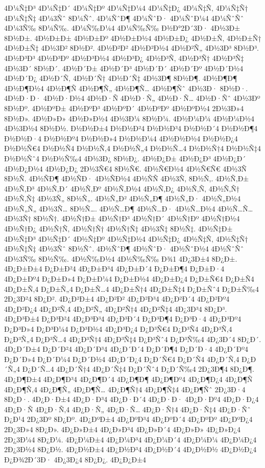 {4Ð¼Ñ‡Ð³
4Ð¼Ñ‡Ð´
4Ð¼Ñ‡Ðº
4Ð¼Ñ‡Ð¼4
4Ð¼Ñ‡Ð¿
4Ð¼Ñ‡Ñ‚
4Ð¼Ñ‡Ñ†
4Ð¼Ñ‡Ñ‡
4Ð¼3Ñˆ
8Ð¼Ñˆ.
4Ð¼ÑˆÐ¶
4Ð¼ÑˆÐ·
4Ð¼ÑˆÐ¼4
4Ð¼ÑˆÑˆ
4Ð¼3Ñ‰
8Ð¼Ñ‰.
4Ð¼Ñ‰Ð¼4
4Ð¼Ñ‰Ñ‰
Ð½Ð°2Ð´3Ð·
4Ð½3Ð±
8Ð½Ð±.
4Ð½Ð±Ð±
4Ð½Ð±Ðº
4Ð½Ð±Ð½4
4Ð½Ð±Ð¿
4Ð½Ð±Ñ‚
4Ð½Ð±Ñ†
4Ð½Ð±Ñ‡
4Ð½3Ð²
8Ð½Ð².
4Ð½Ð²Ð²
4Ð½Ð²Ð½4
4Ð½Ð²Ñ„
4Ð½3Ð³
8Ð½Ð³.
4Ð½Ð³Ð³
4Ð½Ð³Ðº
4Ð½Ð³Ð½4
4Ð½Ð³Ð¿
4Ð½Ð³Ñ‚
4Ð½Ð³Ñ†
4Ð½Ð³Ñ‡
4Ð½3Ð´
8Ð½Ð´.
4Ð½Ð´Ð±
4Ð½Ð´Ð³
4Ð½Ð´Ð´
4Ð½Ð´Ðº
4Ð½Ð´Ð½4
4Ð½Ð´Ð¿
4Ð½Ð´Ñ‚
4Ð½Ð´Ñ†
4Ð½Ð´Ñ‡
4Ð½3Ð¶
8Ð½Ð¶.
4Ð½Ð¶Ð¶
4Ð½Ð¶Ð½4
4Ð½Ð¶Ñ
4Ð½Ð¶Ñ„
4Ð½Ð¶Ñ…
4Ð½Ð¶Ñˆ
4Ð½3Ð·
8Ð½Ð·.
4Ð½Ð·Ð·
4Ð½Ð·Ð½4
4Ð½Ð·Ñ
4Ð½Ð·Ñ„
4Ð½Ð·Ñ…
4Ð½Ð·Ñˆ
4Ð½3Ðº
8Ð½Ðº.
4Ð½ÐºÐ±
4Ð½ÐºÐ³
4Ð½ÐºÐ´
4Ð½ÐºÐº
4Ð½ÐºÐ½4
2Ð½3Ð»4
8Ð½Ð».
4Ð½Ð»Ð»
4Ð½Ð»Ð½4
4Ð½3Ð¼
8Ð½Ð¼.
4Ð½Ð¼Ð¼
4Ð½Ð¼Ð½4
4Ð½3Ð½4
8Ð½Ð½.
Ð½Ð½Ð±4
Ð½Ð½Ð²4
Ð½Ð½Ð³4
Ð½Ð½Ð´4
Ð½Ð½Ð¶4
Ð½Ð½Ð·4
Ð½Ð½Ðº4
Ð½Ð½Ð»4
Ð½Ð½Ð¼4
4Ð½Ð½Ð½4
Ð½Ð½Ð¿4
Ð½Ð½Ñ€4
Ð½Ð½Ñ4
Ð½Ð½Ñ‚4
Ð½Ð½Ñ„4
Ð½Ð½Ñ…4
Ð½Ð½Ñ†4
Ð½Ð½Ñ‡4
Ð½Ð½Ñˆ4
Ð½Ð½Ñ‰4
4Ð½3Ð¿
8Ð½Ð¿.
4Ð½Ð¿Ð±
4Ð½Ð¿Ð³
4Ð½Ð¿Ð´
4Ð½Ð¿Ð½4
4Ð½Ð¿Ð¿
2Ð½3Ñ€4
8Ð½Ñ€.
4Ð½Ñ€Ð½4
4Ð½Ñ€Ñ€
4Ð½3Ñ
8Ð½Ñ.
4Ð½ÑÐ¶
4Ð½ÑÐ·
4Ð½ÑÐ½4
4Ð½ÑÑ
4Ð½3Ñ‚
8Ð½Ñ‚.
4Ð½Ñ‚Ð±
4Ð½Ñ‚Ð³
4Ð½Ñ‚Ð´
4Ð½Ñ‚Ðº
4Ð½Ñ‚Ð½4
4Ð½Ñ‚Ð¿
4Ð½Ñ‚Ñ‚
4Ð½Ñ‚Ñ†
4Ð½Ñ‚Ñ‡
4Ð½3Ñ„
8Ð½Ñ„.
4Ð½Ñ„Ð²
4Ð½Ñ„Ð¶
4Ð½Ñ„Ð·
4Ð½Ñ„Ð½4
4Ð½Ñ„Ñ„
4Ð½3Ñ…
8Ð½Ñ….
4Ð½Ñ…Ð¶
4Ð½Ñ…Ð·
4Ð½Ñ…Ð½4
4Ð½Ñ…Ñ…
4Ð½3Ñ†
8Ð½Ñ†.
4Ð½Ñ†Ð±
4Ð½Ñ†Ð³
4Ð½Ñ†Ð´
4Ð½Ñ†Ðº
4Ð½Ñ†Ð½4
4Ð½Ñ†Ð¿
4Ð½Ñ†Ñ‚
4Ð½Ñ†Ñ†
4Ð½Ñ†Ñ‡
4Ð½3Ñ‡
8Ð½Ñ‡.
4Ð½Ñ‡Ð±
4Ð½Ñ‡Ð³
4Ð½Ñ‡Ð´
4Ð½Ñ‡Ðº
4Ð½Ñ‡Ð½4
4Ð½Ñ‡Ð¿
4Ð½Ñ‡Ñ‚
4Ð½Ñ‡Ñ†
4Ð½Ñ‡Ñ‡
4Ð½3Ñˆ
8Ð½Ñˆ.
4Ð½ÑˆÐ¶
4Ð½ÑˆÐ·
4Ð½ÑˆÐ½4
4Ð½ÑˆÑˆ
4Ð½3Ñ‰
8Ð½Ñ‰.
4Ð½Ñ‰Ð½4
4Ð½Ñ‰Ñ‰
Ð¾1
4Ð¿3Ð±4
8Ð¿Ð±.
4Ð¿Ð±Ð±4
Ð¿Ð±Ð²4
4Ð¿Ð±Ð³4
4Ð¿Ð±Ð´4
Ð¿Ð±Ð¶4
Ð¿Ð±Ð·4
4Ð¿Ð±Ðº4
Ð¿Ð±Ð»4
Ð¿Ð±Ð¼4
Ð¿Ð±Ð½4
4Ð¿Ð±Ð¿4
Ð¿Ð±Ñ€4
Ð¿Ð±Ñ4
4Ð¿Ð±Ñ‚4
Ð¿Ð±Ñ„4
Ð¿Ð±Ñ…4
4Ð¿Ð±Ñ†4
4Ð¿Ð±Ñ‡4
Ð¿Ð±Ñˆ4
Ð¿Ð±Ñ‰4
2Ð¿3Ð²4
8Ð¿Ð².
4Ð¿Ð²Ð±4
4Ð¿Ð²Ð²
4Ð¿Ð²Ð³4
4Ð¿Ð²Ð´4
4Ð¿Ð²Ðº4
4Ð¿Ð²Ð¿4
4Ð¿Ð²Ñ‚4
4Ð¿Ð²Ñ„
4Ð¿Ð²Ñ†4
4Ð¿Ð²Ñ‡4
4Ð¿3Ð³4
8Ð¿Ð³.
4Ð¿Ð³Ð±4
Ð¿Ð³Ð²4
4Ð¿Ð³Ð³4
4Ð¿Ð³Ð´4
Ð¿Ð³Ð¶4
Ð¿Ð³Ð·4
4Ð¿Ð³Ðº4
Ð¿Ð³Ð»4
Ð¿Ð³Ð¼4
Ð¿Ð³Ð½4
4Ð¿Ð³Ð¿4
Ð¿Ð³Ñ€4
Ð¿Ð³Ñ4
4Ð¿Ð³Ñ‚4
Ð¿Ð³Ñ„4
Ð¿Ð³Ñ…4
4Ð¿Ð³Ñ†4
4Ð¿Ð³Ñ‡4
Ð¿Ð³Ñˆ4
Ð¿Ð³Ñ‰4
4Ð¿3Ð´4
8Ð¿Ð´.
4Ð¿Ð´Ð±4
Ð¿Ð´Ð²4
4Ð¿Ð´Ð³4
4Ð¿Ð´Ð´4
Ð¿Ð´Ð¶4
Ð¿Ð´Ð·4
4Ð¿Ð´Ðº4
Ð¿Ð´Ð»4
Ð¿Ð´Ð¼4
Ð¿Ð´Ð½4
4Ð¿Ð´Ð¿4
Ð¿Ð´Ñ€4
Ð¿Ð´Ñ4
4Ð¿Ð´Ñ‚4
Ð¿Ð´Ñ„4
Ð¿Ð´Ñ…4
4Ð¿Ð´Ñ†4
4Ð¿Ð´Ñ‡4
Ð¿Ð´Ñˆ4
Ð¿Ð´Ñ‰4
2Ð¿3Ð¶4
8Ð¿Ð¶.
4Ð¿Ð¶Ð±4
4Ð¿Ð¶Ð³4
4Ð¿Ð¶Ð´4
4Ð¿Ð¶Ð¶
4Ð¿Ð¶Ðº4
4Ð¿Ð¶Ð¿4
4Ð¿Ð¶Ñ
4Ð¿Ð¶Ñ‚4
4Ð¿Ð¶Ñ„
4Ð¿Ð¶Ñ…
4Ð¿Ð¶Ñ†4
4Ð¿Ð¶Ñ‡4
4Ð¿Ð¶Ñˆ
2Ð¿3Ð·4
8Ð¿Ð·.
4Ð¿Ð·Ð±4
4Ð¿Ð·Ð³4
4Ð¿Ð·Ð´4
4Ð¿Ð·Ð·
4Ð¿Ð·Ðº4
4Ð¿Ð·Ð¿4
4Ð¿Ð·Ñ
4Ð¿Ð·Ñ‚4
4Ð¿Ð·Ñ„
4Ð¿Ð·Ñ…
4Ð¿Ð·Ñ†4
4Ð¿Ð·Ñ‡4
4Ð¿Ð·Ñˆ
Ð¿Ð¹4
2Ð¿3Ðº
8Ð¿Ðº.
4Ð¿ÐºÐ±4
4Ð¿ÐºÐ³4
4Ð¿ÐºÐ´4
4Ð¿ÐºÐº
4Ð¿ÐºÐ¿4
2Ð¿3Ð»4
8Ð¿Ð».
4Ð¿Ð»Ð±4
4Ð¿Ð»Ð³4
4Ð¿Ð»Ð´4
4Ð¿Ð»Ð»
4Ð¿Ð»Ð¿4
2Ð¿3Ð¼4
8Ð¿Ð¼.
4Ð¿Ð¼Ð±4
4Ð¿Ð¼Ð³4
4Ð¿Ð¼Ð´4
4Ð¿Ð¼Ð¼
4Ð¿Ð¼Ð¿4
2Ð¿3Ð½4
8Ð¿Ð½.
4Ð¿Ð½Ð±4
4Ð¿Ð½Ð³4
4Ð¿Ð½Ð´4
4Ð¿Ð½Ð½
4Ð¿Ð½Ð¿4
Ð¿Ð¾2Ð´3Ð·
4Ð¿3Ð¿4
8Ð¿Ð¿.
4Ð¿Ð¿Ð±4
}
